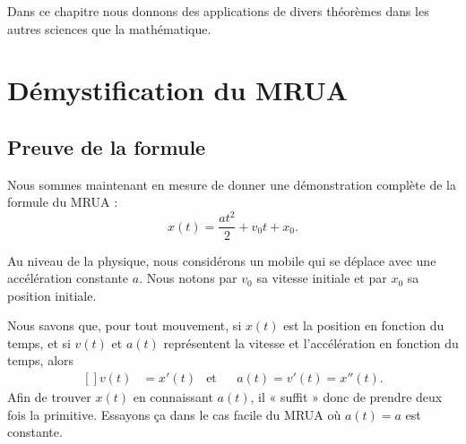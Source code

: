 
Dans ce chapitre nous donnons des applications de divers théorèmes dans les autres sciences que la mathématique.

\section{Démystification du MRUA}
\label{SecMRUAsecondeGGdQoT}

\subsection{Preuve de la formule}

Nous sommes maintenant en mesure de donner une démonstration complète de la formule du MRUA :
\begin{equation}    \label{EqMRUAINT}
	x(t) = \frac{ at^2 }{ 2 } + v_0t +x_0.
\end{equation}

Au niveau de la physique, nous considérons un mobile qui se déplace avec une accélération constante $a$. Nous notons par $v_0$ sa vitesse initiale et par $x_0$ sa position initiale.

Nous savons que, pour tout mouvement, si $x(t)$ est la position en fonction du temps, et si $v(t)$ et $a(t)$ représentent la vitesse et l'accélération en fonction du temps, alors
\begin{equation}
	\begin{aligned}[]
		v(t) & =x'(t) & \text{et} &  & a(t)=v'(t)=x''(t).
	\end{aligned}
\end{equation}
Afin de trouver $x(t)$ en connaissant $a(t)$, il « suffit » donc de prendre deux fois la primitive. Essayons ça dans le cas facile du MRUA où $a(t)=a$ est constante.

